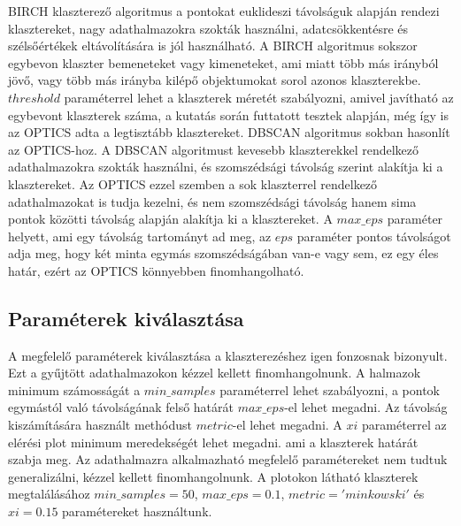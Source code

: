 \documentclass[acmtog, authorversion]{acmart}
\begin{document}
BIRCH klaszterező algoritmus a pontokat euklideszi távolságuk alapján rendezi klasztereket, nagy adathalmazokra szokták használni, adatcsökkentésre és szélsőértékek eltávolítására is jól használható.
A BIRCH algoritmus sokszor egybevon klaszter bemeneteket vagy kimeneteket, ami miatt több más irányból jövő, vagy több más irányba kilépő objektumokat sorol azonos klaszterekbe.
\begin{math}threshold\end{math} paraméterrel lehet a klaszterek méretét szabályozni, amivel javítható az egybevont klaszterek száma, a kutatás során futtatott tesztek alapján, még
így is az OPTICS adta a legtisztább klasztereket. 
DBSCAN algoritmus sokban hasonlít az OPTICS-hoz. A DBSCAN algoritmust kevesebb klaszterekkel rendelkező adathalmazokra szokták használni, és szomszédsági távolság szerint alakítja ki a klasztereket. 
Az OPTICS ezzel szemben a sok klaszterrel rendelkező adathalmazokat is tudja kezelni, és nem szomszédsági távolság hanem sima pontok közötti távolság alapján alakítja ki a klasztereket.
A \begin{math}max\_eps\end{math} paraméter helyett, ami egy távolság tartományt ad meg, az \begin{math}eps\end{math} paraméter  
pontos távolságot adja meg, hogy két minta egymás szomszédságában van-e vagy sem, ez egy éles határ, ezért az OPTICS könnyebben finomhangolható.

\subsection{Paraméterek kiválasztása}
A megfelelő paraméterek kiválasztása a klaszterezéshez igen fonzosnak bizonyult. Ezt a gyűjtött adathalmazokon kézzel kellett finomhangolnunk.
A halmazok minimum számosságát a \begin{math}min\_samples\end{math} paraméterrel lehet szabályozni, a pontok egymástól való távolságának
felső határát \begin{math}max\_eps\end{math}-el lehet megadni. Az távolság kiszámítására használt methódust \begin{math}metric\end{math}-el
lehet megadni. A \begin{math}xi\end{math} paraméterrel az elérési plot minimum meredekségét lehet megadni. ami a klaszterek határát szabja meg.
Az adathalmazra alkalmazható megfelelő paramétereket nem tudtuk generalizálni, kézzel kellett finomhangolnunk. A plotokon látható klaszterek
megtalálásához \begin{math}min\_samples=50\end{math}, \begin{math}max\_eps=0.1\end{math}, \begin{math}metric='minkowski'\end{math} és \begin{math}xi=0.15\end{math}
paramétereket használtunk.
\end{document}
